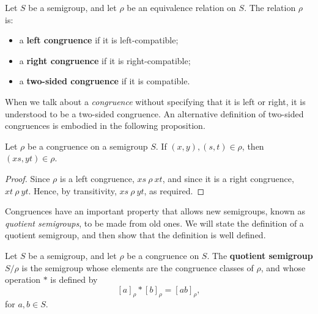 \begin{definition}
  \label{def:congruence}
  Let $S$ be a semigroup, and let $\rho$ be an equivalence relation on $S$.  The
  relation $\rho$ is:
  \begin{itemize}
  \item a \textbf{left congruence} if it is left-compatible;
  \item a \textbf{right congruence} if it is right-compatible;
  \item a \textbf{two-sided congruence} if it is compatible.
  \end{itemize}
\end{definition}

When we talk about a \textit{congruence} without specifying that it is left or
right, it is understood to be a two-sided congruence.   An alternative
definition of two-sided congruences is embodied in the following proposition.

\begin{proposition}
  \label{prop:cong-def}
  Let $\rho$ be a congruence on a semigroup $S$.  If $(x, y), (s, t) \in \rho$,
  then $(xs, yt) \in \rho$.
  \begin{proof}
    Since $\rho$ is a left congruence, $xs ~\rho~ xt$, and since it is a right
    congruence, $xt ~\rho~ yt$.  Hence, by transitivity, $xs ~\rho~ yt$, as
    required.
  \end{proof}
\end{proposition}

Congruences have an important property that allows new semigroups, known as
\textit{quotient semigroups}, to be made from old ones.  We will state the
definition of a quotient semigroup, and then show that the definition is well
defined.

\begin{definition}
  \label{def:quotient}
  Let $S$ be a semigroup, and let $\rho$ be a congruence on $S$.  The
  \textbf{quotient semigroup} $S / \rho$ is the semigroup whose elements are the
  congruence classes of $\rho$, and whose operation $*$ is defined by
  $$[a]_\rho * [b]_\rho = [ab]_\rho,$$
  for $a, b \in S$.
\end{definition}

